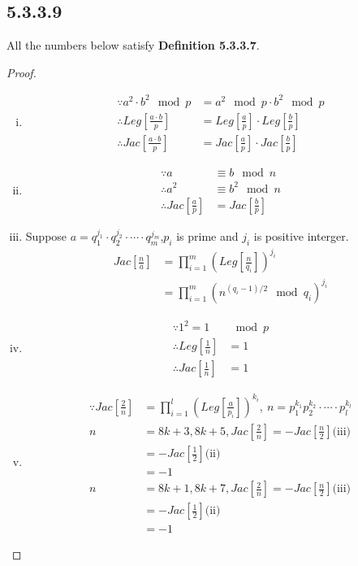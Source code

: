 \documentclass[twocolumn]{article}
\begin{document}
	\subsection*{5.3.3.9}
		All the numbers below satisfy \textbf{Definition 5.3.3.7}.
	\begin{proof}
		\begin{enumerate}[(i)]
			\item \[
			\begin{aligned}
				\because a^2\cdot b^2\mod p&=a^2\mod p\cdot b^2\mod p\\
				\therefore Leg\left[\frac{a\cdot b}{p}\right]&=Leg\left[\frac{a}{p}\right]\cdot Leg\left[\frac{b}{p}\right]\\
				\therefore Jac\left[\frac{a\cdot b}{p}\right]&=Jac\left[\frac{a}{p}\right]\cdot Jac\left[\frac{b}{p}\right]
			\end{aligned}
			\]
			\item 
			\[
			\begin{aligned}
				\because a&\equiv b\mod n\\
				\therefore a^2&\equiv b^2\mod n\\
				\therefore Jac\left[\frac{a}{p}\right]&=Jac\left[\frac{b}{p}\right]
			\end{aligned}
			\]
			\item
				Suppose $a=q_1^{j_1}\cdot q_2^{j_2}\cdot\cdots\cdot q_m^{j_m}$,$p_i$ is prime and $j_i$ is positive interger. 
			\[
			\begin{aligned}
			Jac\left[\frac{n}{a}\right]&=\prod_{i=1}^{m}\left(Leg\left[\frac{n}{q_i}\right]\right)^{j_i}\\
			&=\prod_{i=1}^{m}\left(n^{(q_i-1)/2}\mod q_i\right)^{j_i}
			\end{aligned}
			\] 
			\item
			\[
			\begin{aligned}
				\because 1^2=1&\mod p\\
				\therefore Leg\left[\frac{1}{n}\right]&=1\\
				\therefore Jac\left[\frac{1}{n}\right]&=1
			\end{aligned}
			\]
			\item 
			\[
			\begin{aligned}
				\because Jac\left[\frac{2}{n}\right]&=\prod_{i=1}^{l}\left(Leg\left[\frac{a}{p_i}\right]\right)^{k_i},\ n=p_1^{k_1}p_2^{k_2}\cdot\cdots\cdot p_l^{k_l}\\
				n&=8k+3,8k+5,Jac\left[\frac{2}{n}\right]=-Jac\left[\frac{n}{2}\right]\text{(iii)}\\
				&=-Jac\left[\frac{1}{2}\right]\text{(ii)}\\
				&=-1\\
				n&=8k+1,8k+7,Jac\left[\frac{2}{n}\right]=-Jac\left[\frac{n}{2}\right]\text{(iii)}\\
				&=-Jac\left[\frac{1}{2}\right]\text{(ii)}\\
				&=-1
			\end{aligned}
			\]
		\end{enumerate}
	\end{proof}
\end{document}

